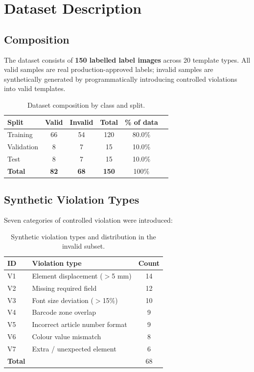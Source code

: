\section{Dataset Description}
\label{sec:dataset}

\subsection{Composition}

The dataset consists of \textbf{150 labelled label images} across 20 template types.
All valid samples are real production-approved labels; invalid samples are synthetically
generated by programmatically introducing controlled violations into valid templates.

\begin{table}[h]
\centering
\caption{Dataset composition by class and split.}
\label{tab:dataset}
\begin{tabular}{lccccc}
\toprule
\textbf{Split} & \textbf{Valid} & \textbf{Invalid} & \textbf{Total} & \textbf{\% of data} \\
\midrule
Training   & 66 & 54 & 120 & 80.0\% \\
Validation & 8  & 7  & 15  & 10.0\% \\
Test       & 8  & 7  & 15  & 10.0\% \\
\midrule
\textbf{Total} & \textbf{82} & \textbf{68} & \textbf{150} & 100\% \\
\bottomrule
\end{tabular}
\end{table}

\subsection{Synthetic Violation Types}

Seven categories of controlled violation were introduced:

\begin{table}[h]
\centering
\caption{Synthetic violation types and distribution in the invalid subset.}
\label{tab:violations}
\begin{tabular}{llc}
\toprule
\textbf{ID} & \textbf{Violation type} & \textbf{Count} \\
\midrule
V1 & Element displacement ($>$5 mm)       & 14 \\
V2 & Missing required field               & 12 \\
V3 & Font size deviation ($>$15\%)        & 10 \\
V4 & Barcode zone overlap                 & 9  \\
V5 & Incorrect article number format      & 9  \\
V6 & Colour value mismatch                & 8  \\
V7 & Extra / unexpected element           & 6  \\
\midrule
\textbf{Total}                            && 68 \\
\bottomrule
\end{tabular}
\end{table}

